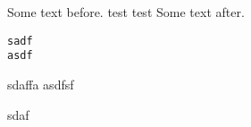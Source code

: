 \documentclass[a4paper, 12pt, twoside]{artikel3}
\newenvironment{myverbatim}%
  {\endgraf\Verbatim}%
  {\endVerbatim}
\def\[{\lstlisting}
\def\]{\endlstlisting}
\begin{document}
\lstset{language=sh}
Some text before.
\begin{myverbatim}
test
test
\end{myverbatim}
Some text after.
\begin{lstlisting}
sadf
asdf
\end{lstlisting}

sdaffa
asdfsf
\]

sdaf
\end{document}
